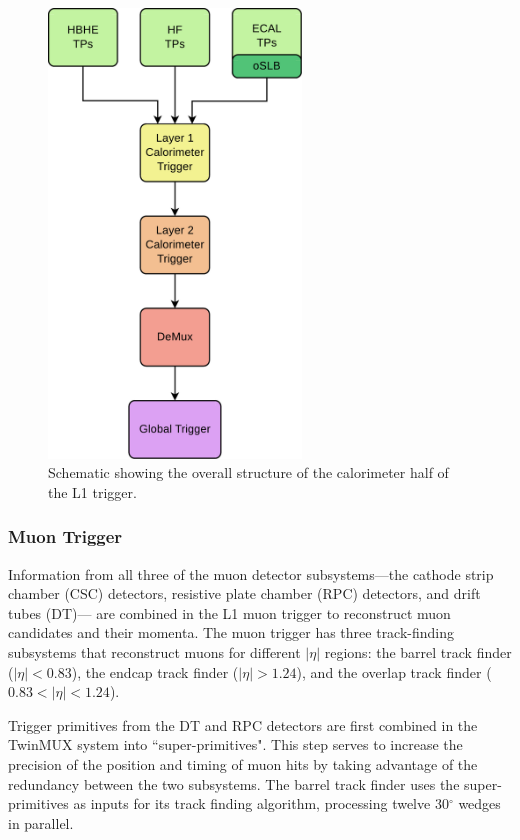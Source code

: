 \begin{figure}[h]
\begin{center}
\includegraphics[width=0.6\textwidth]{Figures/Trigger/caloL1T.pdf}
\end{center}
\caption{Schematic showing the overall structure of the calorimeter half of the L1 trigger.}
\label{fig:caloL1T}
\end{figure}


\subsubsection{Muon Trigger}
Information from all three of the muon detector subsystems---the cathode strip chamber (CSC) detectors, resistive plate chamber (RPC) detectors, and drift tubes (DT)--- are combined in the L1 muon trigger to reconstruct muon candidates and their momenta. The muon trigger has three track-finding subsystems that reconstruct muons for different $|\eta|$ regions: the barrel track finder ($|\eta| < 0.83$), the endcap track finder ($|\eta| > 1.24$), and the overlap track finder ($0.83 < |\eta| < 1.24$).

Trigger primitives from the DT and RPC detectors are first combined in the TwinMUX system into ``super-primitives". This step serves to increase the precision of the position and timing of muon hits by taking advantage of the redundancy between the two subsystems.  The barrel track finder uses the super-primitives as inputs for its track finding algorithm, processing twelve 30$^{\circ}$ wedges in parallel. 


